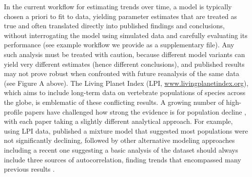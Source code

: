 \documentclass[11pt]{article}
\begin{document}
\begin{tcolorbox}
{\begin{multicols}{2}
In the current workflow for estimating trends over time, a model is typically chosen a priori to fit to data, yielding parameter estimates that are treated as true and often translated directly into published findings and conclusions, without interrogating the model using simulated data and carefully evaluating its performance (see example workflow we provide as a supplementary file). Any such analysis must be treated with caution, because different model variants can yield very different estimates (hence different conclusions), and published results may not prove robust when confronted with future reanalysis of the same data (see Figure A above).
The Living Planet Index (LPI, \url{www.livingplanetindex.org}), which aims to include long-term data on vertebrate populations of species across the globe, is emblematic of these conflicting results. %
A growing number of high-profile papers have challenged how strong the evidence is for population decline \citep{Dornelas2014,gonzalez2016estimating,wagner2021insect,muller2024weather}, with each paper taking a slightly different analytical approach. For example, using LPI data, \citet{Leung2020} published a mixture model that suggested most populations were not significantly declining, followed by other alternative modeling approaches \citep{Buschke2021,puurtinen2022living} including a recent one suggesting a basic analysis of the dataset should always include three sources of autocorrelation, finding trends that encompassed many previous results \citep{Johnson2024}. 


\vfill

\columnbreak


\end{multicols}}
\end{tcolorbox}
\end{document}
